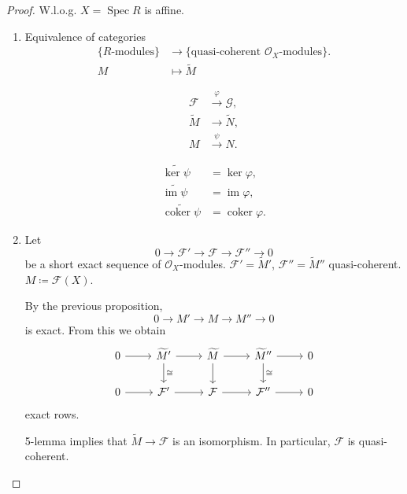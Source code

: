\documentclass[12pt]{article}
\DeclareMathOperator{\im}{im}
\DeclareMathOperator{\coker}{coker}
\DeclareMathOperator{\Spec}{Spec}
\theoremstyle{definition}
\begin{document}
\begin{proof}
W.l.o.g. $X=\Spec R$ is affine.
\begin{enumerate}[label=\arabic*)]
\item Equivalence of categories
\begin{align*}
\{R\text{-modules}\}&\longrightarrow\{\text{quasi-coherent }\mathcal O_X\text{-modules}\}.\\M&\longmapsto\widetilde M
\end{align*}

\begin{align*}
\mathcal F&\overset\varphi\longrightarrow\mathcal G,\\\widetilde M&\longrightarrow\widetilde N,\\M&\overset\psi\longrightarrow N.
\end{align*}

\begin{align*}
\widetilde{\ker\psi}&=\ker\varphi,\\\widetilde{\im\psi}&=\im\varphi,\\\widetilde{\coker\psi}&=\coker\varphi.
\end{align*}

\item Let
\[0\longrightarrow\mathcal F'\longrightarrow\mathcal F\longrightarrow\mathcal F''\longrightarrow0\]
be a short exact sequence of $\mathcal O_X$-modules. $\mathcal F'=\widetilde M'$, $\mathcal F''=\widetilde M''$ quasi-coherent. $M\coloneqq\mathcal F(X)$.

By the previous proposition,
\[0\longrightarrow M'\longrightarrow M\longrightarrow M''\longrightarrow0\]
is exact. From this we obtain
\[\begin{tikzcd}0\arrow[r]&\widetilde M'\arrow[r]\arrow[d,"\cong"]&\widetilde M\arrow[r]\arrow[d]&\widetilde M''\arrow[r]\arrow[d,"\cong"]&0\\0\arrow[r]&\mathcal F'\arrow[r]&\mathcal F\arrow[r]&\mathcal F''\arrow[r]&0\end{tikzcd}\]
exact rows.

5-lemma implies that $\widetilde M\rightarrow\mathcal F$ is an isomorphism. In particular, $\mathcal F$ is quasi-coherent.
\end{enumerate}
\end{proof}
\end{document}
